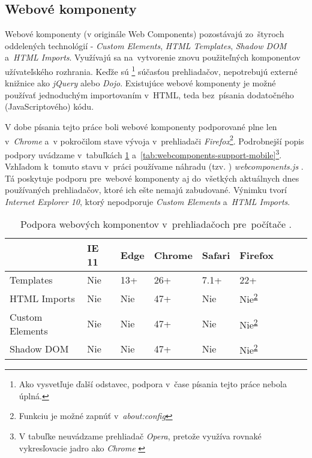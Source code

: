 \subsection{Webové komponenty}

Webové komponenty (v originále Web Components) pozostávajú zo~štyroch oddelených technológií - \emph{Custom Elements}, \emph{HTML Templates}, \emph{Shadow DOM} a~\emph{HTML Imports}. Využívajú sa na~vytvorenie znovu použiteľných komponentov užívateľského rozhrania. Keďže sú \footnote{Ako vysvetľuje ďalší odstavec, podpora v~čase písania tejto práce nebola úplná.} súčasťou prehliadačov, nepotrebujú externé knižnice ako \emph{jQuery} alebo \emph{Dojo}. Existujúce webové komponenty je možné používať jednoduchým importovaním v~HTML, teda bez~písania dodatočného (JavaScriptového) kódu. \cite{MDN_WebComponents}

V dobe písania tejto práce boli webové komponenty podporované plne len v~\emph{Chrome} a~v pokročilom stave vývoja v~prehliadači \emph{Firefox}\footnote{Funkciu je možné zapnúť v~\emph{about:config}\label{aboutconfig}}. Podrobnejší popis podpory uvádzame v~tabuľkách \ref{tab:webcomponents-support-desktop} a~\ref{tab:webcomponents-support-mobile}\footnote{V tabuľke neuvádzame prehliadač \emph{Opera}, pretože využíva rovnaké vykresľovacie jadro ako \emph{Chrome} \cite{Opera_History}}. Vzhľadom k~tomuto stavu v~práci používame náhradu (tzv. ) \emph{webcomponents.js} \cite{Webcomponents_polyfill}. Tá poskytuje podporu pre~webové komponenty aj do~všetkých aktuálnych dnes používaných prehliadačov, ktoré ich ešte nemajú zabudované. Výnimku tvorí \emph{Internet Explorer 10}, ktorý nepodporuje \emph{Custom Elements} a~\emph{HTML Imports}. \cite{Webcomponents_polyfill}


\begin{table}[]
\centering
\begin{tabular}{@{}|l|l|l|l|l|l|l|l|l|@{}}
\toprule
                & IE 11  & Edge & Chrome & Safari & Firefox 								   \\ \midrule
Templates       & Nie    & 13+  & 26+    & 7.1+   & 22+     								   \\ \midrule
HTML Imports    & Nie    & Nie  & 47+    & Nie    & Nie\textsuperscript{\ref{aboutconfig}}    \\ \midrule
Custom Elements & Nie    & Nie  & 47+    & Nie    & Nie\textsuperscript{\ref{aboutconfig}}    \\ \midrule
Shadow DOM      & Nie    & Nie  & 47+    & Nie    & Nie\textsuperscript{\ref{aboutconfig}}    \\ \bottomrule
\end{tabular}
\caption{Podpora webových komponentov v~prehliadačoch pre~počítače \cite{MDN_Template_Element}. \cite{CIU}}
\label{tab:webcomponents-support-desktop}
\end{table}

